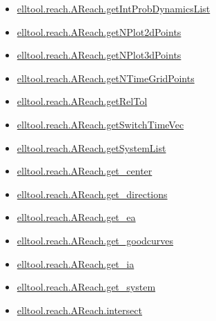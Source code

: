 \documentclass[letterpaper,10pt,english]{sphinxmanual}
\begin{document}
\begin{itemize}
\item {} 
{\hyperref[chap_functions:elltool-reach-areach-getintprobdynamicslist]{elltool.reach.AReach.getIntProbDynamicsList}}

\item {} 
{\hyperref[chap_functions:elltool-reach-areach-getnplot2dpoints]{elltool.reach.AReach.getNPlot2dPoints}}

\item {} 
{\hyperref[chap_functions:elltool-reach-areach-getnplot3dpoints]{elltool.reach.AReach.getNPlot3dPoints}}

\item {} 
{\hyperref[chap_functions:elltool-reach-areach-getntimegridpoints]{elltool.reach.AReach.getNTimeGridPoints}}

\item {} 
{\hyperref[chap_functions:elltool-reach-areach-getreltol]{elltool.reach.AReach.getRelTol}}

\item {} 
{\hyperref[chap_functions:elltool-reach-areach-getswitchtimevec]{elltool.reach.AReach.getSwitchTimeVec}}

\item {} 
{\hyperref[chap_functions:elltool-reach-areach-getsystemlist]{elltool.reach.AReach.getSystemList}}

\item {} 
{\hyperref[chap_functions:elltool-reach-areach-get-center]{elltool.reach.AReach.get\_center}}

\item {} 
{\hyperref[chap_functions:elltool-reach-areach-get-directions]{elltool.reach.AReach.get\_directions}}

\item {} 
{\hyperref[chap_functions:elltool-reach-areach-get-ea]{elltool.reach.AReach.get\_ea}}

\item {} 
{\hyperref[chap_functions:elltool-reach-areach-get-goodcurves]{elltool.reach.AReach.get\_goodcurves}}

\item {} 
{\hyperref[chap_functions:elltool-reach-areach-get-ia]{elltool.reach.AReach.get\_ia}}

\item {} 
{\hyperref[chap_functions:elltool-reach-areach-get-system]{elltool.reach.AReach.get\_system}}

\item {} 
{\hyperref[chap_functions:elltool-reach-areach-intersect]{elltool.reach.AReach.intersect}}


\end{itemize}
\end{document}
